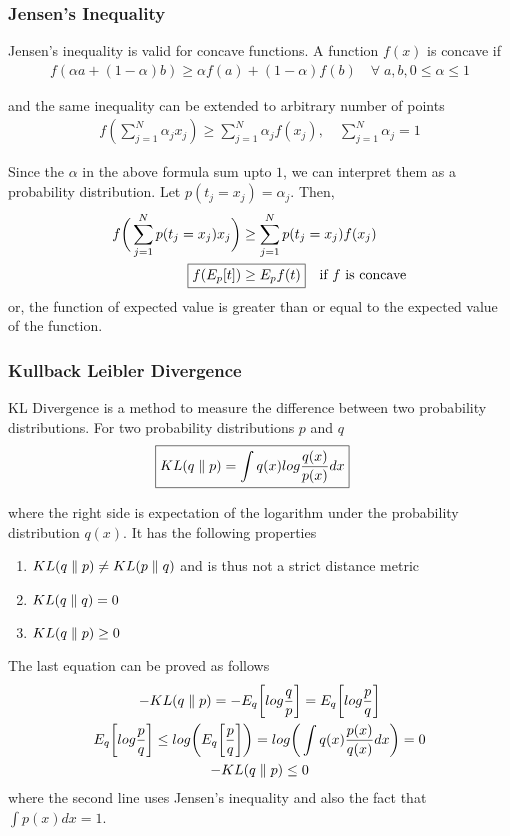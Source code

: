 \documentclass[../statistical_learning_notes.tex]{subfiles}
\begin{document}
\subsubsection*{Jensen's Inequality}
Jensen's inequality is valid for concave functions. A function $f(x)$ is concave if
\begin{align*}
    f(\alpha a + (1-\alpha)b) \geq \alpha f(a) + (1-\alpha)f(b) \quad \forall \; a, b, 0 \leq \alpha \leq 1
\end{align*}

and the same inequality can be extended to arbitrary number of points
\begin{align*}
    f(\sum_{j=1}^{N} \alpha_{j}x_{j}) \geq \sum_{j=1}^{N} \alpha_{j} f(x_{j}), \quad \sum_{j=1}^{N} \alpha_{j} = 1
\end{align*}

Since the $\alpha$ in the above formula sum upto $1$, we can interpret them as a probability distribution. Let $p(t_{j} = x_{j}) = \alpha_{j}$. Then,
\begin{align*}
    f \bigg(\sum_{j=1}^{N} p(t_{j} = x_{j})x_{j} \bigg) &\geq \sum_{j=1}^{N} p(t_{j} = x_{j}) f(x_{j})\\
    \Aboxed{f(E_{p}[t]) &\geq E_{p}f(t)} \quad \text{if $f$ is concave}
\end{align*}
or, the function of expected value is greater than or equal to the expected value of the function.


\subsubsection*{Kullback Leibler Divergence}
KL Divergence is a method to measure the difference between two probability distributions. For two probability distributions $p$ and $q$
\begin{align*}
    \Aboxed{\KL{q}{p} = \int q(x) log\frac{q(x)}{p(x)} dx}
\end{align*}

where the right side is expectation of the logarithm under the probability distribution $q(x)$. It has the following properties
\begin{enumerate}
    \item $KL(q \parallel p) \neq KL(p \parallel q)$ and is thus not a strict distance metric
    \item $KL(q \parallel q) = 0$
    \item $KL(q \parallel p) \geq 0$
\end{enumerate}
The last equation can be proved as follows
\begin{gather*}
    -KL(q \parallel p) = -E_{q} \bigg[log \frac{q}{p} \bigg] = E_{q} \bigg[log \frac{p}{q} \bigg]\\
    E_{q}\bigg[ log\frac{p}{q} \bigg] \leq log \bigg( E_{q} \bigg[\frac{p}{q} \bigg] \bigg) = log \bigg(\int q(x) \frac{p(x)}{q(x)} dx \bigg) = 0\\
    -KL(q \parallel p) \leq 0\\
\end{gather*}
where the second line uses Jensen's inequality and also the fact that $\int p(x) dx = 1$.
\end{document}
